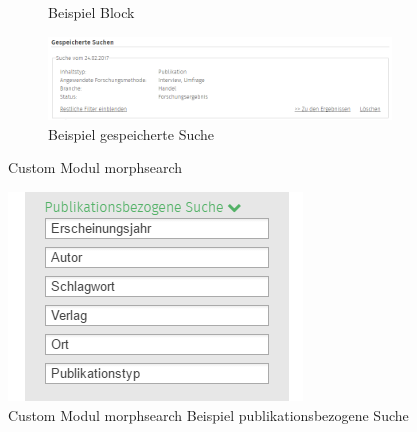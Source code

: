 \begin{figure}[H]
\begin{subfigure}[b]{0.23\textwidth}
		\caption[]{Beispiel Block}
		\label{fig:example_morphsearchblock}
	\end{subfigure}
	\begin{subfigure}[b]{0.50\textwidth}
		\centering
		\includegraphics[width=0.95\linewidth]{images/example_morphsearch_savedsearch}
		\caption[]{Beispiel gespeicherte Suche}
		\label{fig:example_morphsearch_savedsearch}
	\end{subfigure}
	\caption{Custom Modul morphsearch}
	\label{fig:morphsearch}
\end{figure}

\vspace{-1em}
\begin{figure}[H]
	\centering
	\includegraphics[height=0.10\textheight]{images/example_morphsearch_publication}
	\caption{Custom Modul morphsearch Beispiel publikationsbezogene Suche}
	\label{fig:example_morphsearch_publication}
\end{figure}

